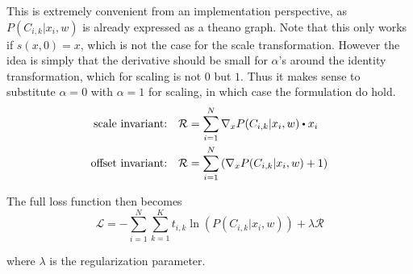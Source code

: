 This is extremely convenient from an implementation perspective, as $P(C_{i, k} | x_i, w)$ is already expressed as a theano graph. Note that this only works if $s(x, 0) = x$, which is not the case for the scale transformation. However the idea is simply that the derivative should be small for $\alpha$'s around the identity transformation, which for scaling is not $0$ but $1$. Thus it makes sense to substitute $\alpha = 0$ with $\alpha = 1$ for scaling, in which case the formulation do hold.
\begin{align}
\text{scale invariant:}&\quad \mathcal{R} = \sum_{i=1}^N \nabla_x P(C_{i, k} | x_i, w)\bigcdot x_i \\
\text{offset invariant:}&\quad \mathcal{R} = \sum_{i=1}^N \left(\nabla_x P(C_{i, k} | x_i, w) + 1\right)
\end{align}

The full loss function then becomes
\begin{equation}
\mathcal{L} = - \sum_{i=1}^N \sum_{k=1}^K t_{i,k} \ln(P(C_{i,k} | x_i, w)) + \lambda \mathcal{R}
\end{equation}

where $\lambda$ is the regularization parameter.

